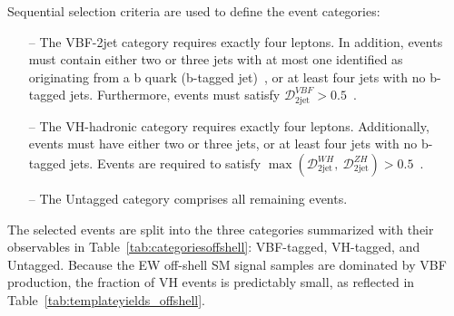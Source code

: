     

Sequential selection criteria are used to define the event categories:
\begin{itemize}
    \item[--] The VBF-2jet category requires exactly four leptons. In addition, events must contain either two or three jets with at most one identified as originating from a b quark (b-tagged jet)~\cite{Sirunyan:2021rug}, or at least four jets with no b-tagged jets. Furthermore, events must satisfy $\mathcal{D}_\text{2jet}^{VBF} > 0.5$~\cite{Sirunyan:2021rug}.
    
    \item[--] The VH-hadronic category requires exactly four leptons. Additionally, events must have either two or three jets, or at least four jets with no b-tagged jets. Events are required to satisfy $\max(\mathcal{D}_\text{2jet}^{WH},~\mathcal{D}_\text{2jet}^{ZH}) > 0.5$~\cite{Sirunyan:2021rug}.
    
    \item[--] The Untagged category comprises all remaining events.
\end{itemize}

The selected events are split into the three categories summarized with their observables in Table~\ref{tab:categoriesoffshell}: VBF-tagged, VH-tagged, and Untagged. Because the EW off-shell SM signal samples are dominated by VBF production, the fraction of VH events is predictably small, as reflected in Table~\ref{tab:templateyields_offshell}.


